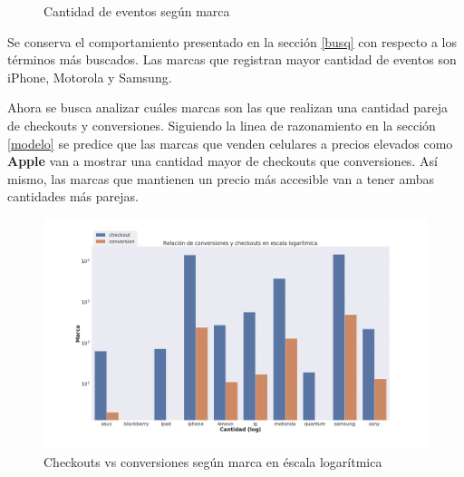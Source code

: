 \documentclass[a4paper]{article}
\begin{document}
\begin{figure}[h!]
	\caption{Cantidad de eventos según marca}
	\label{fig:freqbrands}
\end{figure}

Se conserva el comportamiento presentado en la sección \ref{busq} con respecto a los términos más buscados. Las marcas que registran mayor cantidad de eventos son iPhone, Motorola y Samsung.

Ahora se busca analizar cuáles marcas son las que realizan una cantidad pareja de checkouts y conversiones. Siguiendo la linea de razonamiento en la sección \ref{modelo} se predice que las marcas que venden celulares a precios elevados como \textbf{Apple} van a mostrar una cantidad mayor de checkouts que conversiones. Así mismo, las marcas que mantienen un precio más accesible van a tener ambas cantidades más parejas. 

\begin{figure}[h!]
	\includegraphics[width=\linewidth]{figures/142-conversiones_checkouts_marca-barplot.png}
	\caption{Checkouts vs conversiones según marca en éscala logarítmica}
	\label{fig:brands}
\end{figure}
\end{document}
